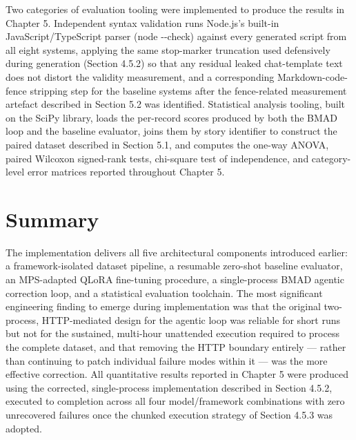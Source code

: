 Two categories of evaluation tooling were implemented to produce the
results in Chapter 5. Independent syntax validation runs Node.js's
built-in JavaScript/TypeScript parser (node -\/-check) against every
generated script from all eight systems, applying the same stop-marker
truncation used defensively during generation (Section 4.5.2) so that
any residual leaked chat-template text does not distort the validity
measurement, and a corresponding Markdown-code-fence stripping step for
the baseline systems after the fence-related measurement artefact
described in Section 5.2 was identified. Statistical analysis tooling,
built on the SciPy library, loads the per-record scores produced by both
the BMAD loop and the baseline evaluator, joins them by story identifier
to construct the paired dataset described in Section 5.1, and computes
the one-way ANOVA, paired Wilcoxon signed-rank tests, chi-square test of
independence, and category-level error matrices reported throughout
Chapter 5.

\section{Summary}

The implementation delivers all five architectural components introduced
earlier: a framework-isolated dataset pipeline, a resumable zero-shot
baseline evaluator, an MPS-adapted QLoRA fine-tuning procedure, a
single-process BMAD agentic correction loop, and a statistical
evaluation toolchain. The most significant engineering finding to emerge
during implementation was that the original two-process, HTTP-mediated
design for the agentic loop was reliable for short runs but not for the
sustained, multi-hour unattended execution required to process the
complete dataset, and that removing the HTTP boundary entirely ---
rather than continuing to patch individual failure modes within it ---
was the more effective correction. All quantitative results reported in
Chapter 5 were produced using the corrected, single-process
implementation described in Section 4.5.2, executed to completion across
all four model/framework combinations with zero unrecovered failures
once the chunked execution strategy of Section 4.5.3 was adopted.
